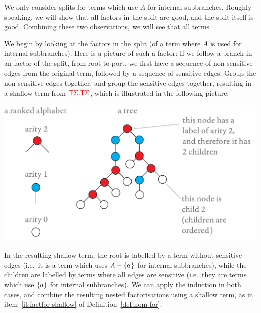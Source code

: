 \begin{itemize}
\begin{center}
\end{center}
    We only consider splits for terms which use $A$ for internal subbranches. Roughly speaking,  we will show that all factors in the split are good, and the split itself is good.  Combining these two observations, we will see that all terms 

    We begin by looking at the factors in the split (of a term where $A$ is used for internal subbranches). Here is a picture of such a factor:
        If we follow a  branch in an factor of the split, from root to port, we first  have a sequence of non-sensitive  edges from the original term, followed by a sequence of sensitive edges. Group the non-sensitive edges together, and group the sensitive edges together, resulting in a shallow term from ${\color{red}{{\color{red}{\mathsf T}}{\color{red}{\Sigma}}. {\color{red}{\mathsf T}}{\color{red}{\Sigma}}}}$, which is illustrated in the following picture:
     \begin{center}
\includegraphics[scale=.3, page=90]{pics}
\end{center}
        In the resulting shallow term,  the root is labelled by a term without sensitive edges (i.e.~it is a term which uses $A - \{a\}$ for internal subbranches), while the children are labelled by terms where all edges are sensitive (i.e.~they are terms which use $\{a\}$ for internal subbranches). We can apply the induction in both cases, and combine the resulting nested factorisations using a shallow term, as in item~\ref{it:factfor-shallow} of Definition~\ref{def:hom-for}.


\end{itemize}
